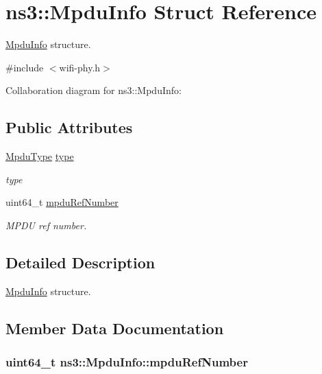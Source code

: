\hypertarget{structns3_1_1MpduInfo}{}\section{ns3\+:\+:Mpdu\+Info Struct Reference}
\label{structns3_1_1MpduInfo}


\hyperlink{structns3_1_1MpduInfo}{Mpdu\+Info} structure.  




{\ttfamily \#include $<$wifi-\/phy.\+h$>$}



Collaboration diagram for ns3\+:\+:Mpdu\+Info\+:
\subsection*{Public Attributes}
\begin{DoxyCompactItemize}
\item 
\hyperlink{namespacens3_ae617d41bbd0c07fa58ee2306f687b055}{Mpdu\+Type} \hyperlink{structns3_1_1MpduInfo_a2b64427e769b57595e1d1c239c62784d}{type}
\begin{DoxyCompactList}\small\item\em type \end{DoxyCompactList}\item 
uint64\+\_\+t \hyperlink{structns3_1_1MpduInfo_a849d90ba8e056d34c7671be75c2fe33c}{mpdu\+Ref\+Number}
\begin{DoxyCompactList}\small\item\em M\+P\+DU ref number. \end{DoxyCompactList}\end{DoxyCompactItemize}


\subsection{Detailed Description}
\hyperlink{structns3_1_1MpduInfo}{Mpdu\+Info} structure. 

\subsection{Member Data Documentation}
\subsubsection[{\texorpdfstring{mpdu\+Ref\+Number}{mpduRefNumber}}]{\setlength{\rightskip}{0pt plus 5cm}uint64\+\_\+t ns3\+::\+Mpdu\+Info\+::mpdu\+Ref\+Number}\hypertarget{structns3_1_1MpduInfo_a849d90ba8e056d34c7671be75c2fe33c}{}\label{structns3_1_1MpduInfo_a849d90ba8e056d34c7671be75c2fe33c}


